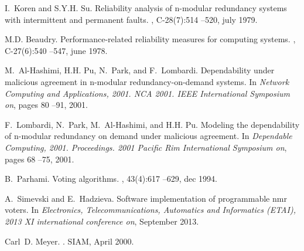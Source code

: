 \documentclass[technote, a4paper, onecolumn]{IEEEtran}  \newcommand{\avtor}{Aleksandar Simevski}
\begin{document}
\begin{thebibliography}{10}
I.~Koren and S.Y.H. Su.
\newblock Reliability analysis of n-modular redundancy systems with
  intermittent and permanent faults.
, C-28(7):514 --520, july 1979.

M.D. Beaudry.
\newblock Performance-related reliability measures for computing systems.
, C-27(6):540 --547, june 1978.

M.~Al-Hashimi, H.H. Pu, N.~Park, and F.~Lombardi.
\newblock Dependability under malicious agreement in n-modular
  redundancy-on-demand systems.
\newblock In {\em Network Computing and Applications, 2001. NCA 2001. IEEE
  International Symposium on}, pages 80 --91, 2001.

F.~Lombardi, N.~Park, M.~Al-Hashimi, and H.H. Pu.
\newblock Modeling the dependability of n-modular redundancy on demand under
  malicious agreement.
\newblock In {\em Dependable Computing, 2001. Proceedings. 2001 Pacific Rim
  International Symposium on}, pages 68 --75, 2001.

B.~Parhami.
\newblock Voting algorithms.
, 43(4):617 --629, dec 1994.

A.~Simevski and E.~Hadzieva.
\newblock Software implementation of programmable nmr voters.
\newblock In {\em Electronics, Telecommunications, Automatics and Informatics
  (ETAI), 2013 XI international conference on}, September 2013.

Carl~D. Meyer.
.
\newblock SIAM, April 2000.

\end{thebibliography}
\end{document}
